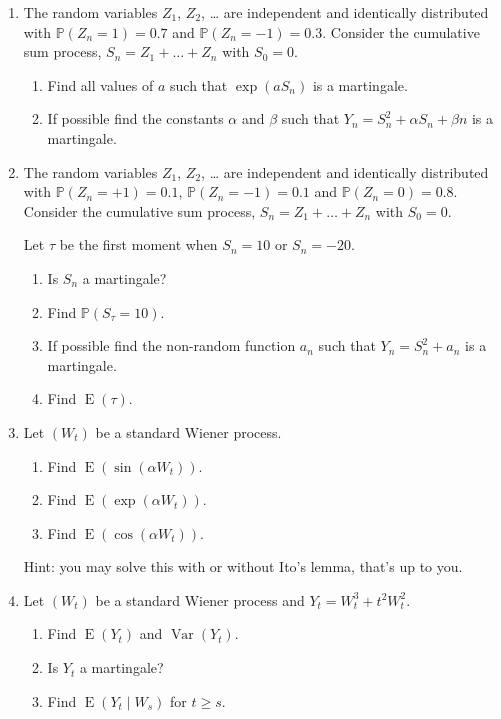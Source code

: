 \documentclass[12pt]{article}
\DeclareMathOperator{\Var}{Var}
\DeclareMathOperator{\E}{E}
\def \P{\mathbb{P}}
\begin{document}
\begin{enumerate}

\item The random variables $Z_1$, $Z_2$, \ldots{} are independent and identically distributed 
with $\P(Z_n = 1) = 0.7$ and $\P(Z_n = -1) = 0.3$. 
Consider the cumulative sum process, $S_n = Z_1 + \ldots + Z_n$ with $S_0=0$.

\begin{enumerate}
  \item Find all values of $a$ such that $\exp(aS_n)$ is a martingale.
  \item If possible find the constants $\alpha$ and $\beta$ such that $Y_n = S_n^2 + \alpha S_n + \beta n$ is a martingale.
\end{enumerate}

\item The random variables $Z_1$, $Z_2$, \ldots{} are independent and identically distributed 
with $\P(Z_n = +1) = 0.1$,  $\P(Z_n = -1) = 0.1$ and $\P(Z_n = 0) = 0.8$. 
Consider the cumulative sum process, $S_n = Z_1 + \ldots + Z_n$ with $S_0=0$.

Let $\tau$ be the first moment when $S_n = 10$ or $S_n = -20$.

\begin{enumerate}
  \item Is $S_n$ a martingale?
  \item Find $\P(S_{\tau} = 10)$.
  \item If possible find the non-random function $a_n$ such that $Y_n = S_n^2 + a_n$ is a martingale. 
  \item Find $\E(\tau)$.
\end{enumerate}

\item Let $(W_t)$ be a standard Wiener process.
\begin{enumerate}
  \item Find $\E(\sin(\alpha W_t))$.
  \item Find $\E(\exp(\alpha W_t))$.
  \item Find $\E(\cos(\alpha W_t))$.
\end{enumerate}
Hint: you may solve this with or without Ito's lemma, that's up to you. 

\item Let $(W_t)$ be a standard Wiener process and $Y_t = W_t^3 + t^2 W_t^2$.
\begin{enumerate}
  \item Find $\E(Y_t)$ and $\Var(Y_t)$.
  \item Is $Y_t$ a martingale?
  \item Find $\E(Y_{t} \mid W_s)$ for $t \geq s$. 
\end{enumerate}


\end{enumerate}
\end{document}
